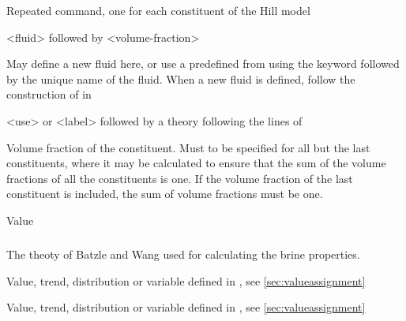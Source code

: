 {
 \slist
   \item \Description Repeated command, one for each constituent of the Hill model
   \item \Argument <fluid> followed by <volume-fraction>
   \item \Default
 \elist

 \slist
   \item \Description May define a new fluid here, or use a predefined  from  using the keyword  followed by the unique name of the fluid. When a new fluid is defined, follow the construction of  in 
   \item \Argument <use> or <label> followed by a theory following the lines of 
   \item \Default
 \elist

 \slist
   \item \Description Volume fraction of the constituent. Must to be specified for all but the last constituents, where it may be calculated to ensure that the sum of the volume fractions of all the constituents is one. If the volume fraction of the last constituent is included, the sum of volume fractions must be one. 
   \item \Argument Value
   \item \Default
 \elist

\subparagraph{}
 \slist
   \item \Description The theoty of Batzle and Wang used for calculating the brine properties.
   \item \Argument 
   \item \Default 
 \elist

 \slist
   \item \Description
   \item \Argument Value, trend, distribution or variable defined in , see \autoref{sec:valueassignment}
   \item \Default
 \elist

 \slist
   \item \Description
   \item \Argument Value, trend, distribution or variable defined in , see \autoref{sec:valueassignment}
   \item \Default
 \elist

}
